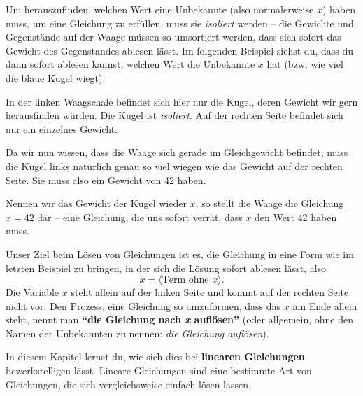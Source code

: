 \documentclass[../../main.tex]{subfiles}
\begin{document}
Um herauszufinden, welchen Wert eine Unbekannte (also normalerweise $x$) haben muss, um eine Gleichung zu erfüllen, muss sie \emph{isoliert} werden -- die Gewichte und Gegenstände auf der Waage müssen so umsortiert werden, dass sich sofort das Gewicht des Gegenstandes ablesen lässt. Im folgenden Beispiel siehst du, dass du dann sofort ablesen kannst, welchen Wert die Unbekannte $x$ hat (bzw. wie viel die blaue Kugel wiegt).

\begin{example}
    
    In der linken Waagschale befindet sich hier nur die Kugel, deren Gewicht wir gern herausfinden würden. Die Kugel ist \emph{isoliert}. Auf der rechten Seite befindet sich nur ein einzelnes Gewicht.
    
    Da wir nun wissen, dass die Waage sich gerade im Gleichgewicht befindet, muss die Kugel links natürlich genau so viel wiegen wie das Gewicht auf der rechten Seite. Sie muss also ein Gewicht von 42 haben.
    
    Nennen wir das Gewicht der Kugel wieder $x$, so stellt die Waage die Gleichung $x=42$ dar -- eine Gleichung, die uns sofort verrät, dass $x$ den Wert 42 haben muss.
\end{example}

Unser Ziel beim Lösen von Gleichungen ist es, die Gleichung in eine Form wie im letzten Beispiel zu bringen, in der sich die Lösung sofort ablesen lässt, also
\[x=\langle\text{Term ohne } x\rangle.\]
Die Variable $x$ steht allein auf der linken Seite und kommt auf der rechten Seite nicht vor. Den Prozess, eine Gleichung so umzuformen, dass das $x$ am Ende allein steht, nennt man \textbf{\enquote{die Gleichung nach \emph{x} auflösen}} (oder allgemein, ohne den Namen der Unbekannten zu nennen: \emph{die Gleichung auflösen}). 

In diesem Kapitel lernst du, wie sich dies bei \textbf{linearen Gleichungen} bewerkstelligen lässt. Lineare Gleichungen sind eine bestimmte Art von Gleichungen, die sich vergleichsweise einfach lösen lassen.
\end{document}
